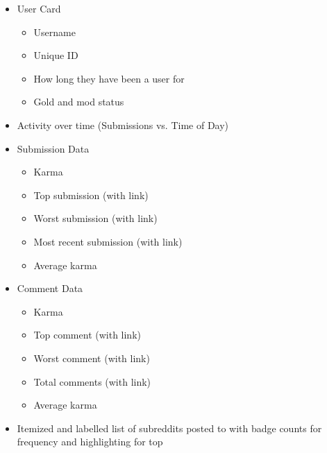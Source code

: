 \documentclass[msc,oneside]{ubcthesis}%
\begin{document}
\begin{itemize}
\item{User Card}
	\begin{itemize}
	\item{Username}
	\item{Unique ID}
	\item{How long they have been a user for}
	\item{Gold and mod status}
	\end{itemize}
\item{Activity over time (Submissions vs. Time of Day)}
\item{Submission Data}
	\begin{itemize}
	\item{Karma}
	\item{Top submission (with link)}
	\item{Worst submission (with link)}
	\item{Most recent submission (with link)}
	\item{Average karma}
	\end{itemize}
\item{Comment Data}
	\begin{itemize}
	\item{Karma}
	\item{Top comment (with link)}
	\item{Worst comment (with link)}
	\item{Total comments (with link)}
	\item{Average karma}
	\end{itemize}
\item{Itemized and labelled list of subreddits posted to with badge counts for frequency and highlighting for top}
\end{itemize}
\end{document}
